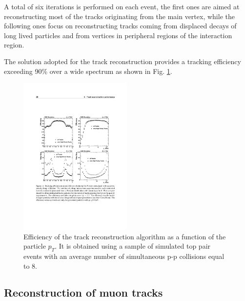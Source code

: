 A total of six iterations is performed on each event, the first ones are aimed at reconstructing most of the tracks originating from the main vertex, while the following ones focus on reconstructing tracks coming from displaced decays of long lived particles and from vertices in peripheral regions of the interaction region.

The solution adopted for the track reconstruction provides a tracking efficiency exceeding 90\% over a wide \pT spectrum as shown in Fig. \ref{fig:tracking_eff}.

\begin{figure}[h!]
\begin{center}
\includegraphics[width=0.5\textwidth]{3_Evt_Reconstruction/pics/trackeff.pdf}
\caption{Efficiency of the track reconstruction algorithm as a function of the particle $p_T$. It is obtained using a sample of simulated top pair events with an average number of simultaneous p-p collisions equal to 8.  
\label{fig:tracking_eff}}
\end{center}
\end{figure}


\subsection{Reconstruction of muon tracks} 

